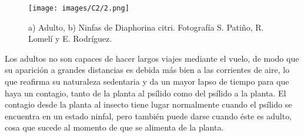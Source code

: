 \begin{figure}[H]
\centering
\texttt{[image: images/C2/2.png]}
\caption{a) Adulto, b) Ninfas de Diaphorina citri. Fotografía S. Patiño, R. Lomelí y E. Rodríguez.}
\end{figure}

Los adultos no son capaces de hacer largos viajes mediante el vuelo, de modo que su aparición a grandes distancias es debida más bien a las corrientes de aire, lo que reafirma su naturaleza sedentaria y da un mayor lapso de tiempo para que haya un contagio, tanto de la planta al psílido como del psílido a la planta. El contagio desde la planta al insecto tiene lugar normalmente cuando el psílido se encuentra en un estado ninfal, pero también puede darse cuando éste es adulto, cosa que sucede al momento de que se alimenta de la planta\cite{lopes2006vetor}.



